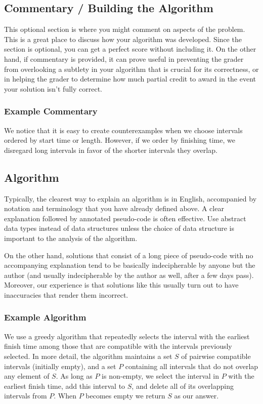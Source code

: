 \documentclass[12pt]{article}
\begin{document}
\subsection{Commentary / Building the Algorithm}
This optional section is where you might comment on aspects of the problem. This is a great place to discuss how your algorithm was developed. Since the section is optional, you can get a perfect score without including it. On the other hand, if commentary is provided, it can prove useful in preventing the grader from overlooking a subtlety in your algorithm that is crucial for its correctness, or in helping the grader to determine how much partial credit to award in the event your solution isn't fully correct.

\subsubsection{Example Commentary}
We notice that it is easy to create counterexamples when we choose intervals ordered by start time or length. However, if we order by finishing time, we disregard long intervals in favor of the shorter intervals they overlap.

\subsection{Algorithm}
Typically, the clearest way to explain an algorithm is in English, accompanied by notation and terminology that you have already defined above. A clear explanation followed by annotated pseudo-code is often effective. Use abstract data types instead of data structures unless the choice of data structure is important to the analysis of the  algorithm.

On the other hand, solutions that consist of a long piece of pseudo-code with
no accompanying explanation tend to be basically indecipherable by anyone but the author (and usually indecipherable by the author as well, after a few days pass). Moreover, our experience is that solutions like this usually turn out to have inaccuracies that render them incorrect.

\subsubsection{Example Algorithm} 

We use a greedy algorithm that repeatedly selects the interval with the earliest finish time among those that are compatible with the intervals previously selected. In more detail, the algorithm maintains a set $S$ of pairwise compatible intervals (initially empty), and a set $P$ containing all intervals that do not overlap any element of $S$. As long as $P$ is non-empty, we select the interval in $P$ with the earliest finish time, add this interval to $S$, and delete all of its overlapping intervals from $P$. When $P$ becomes empty we return $S$ as our answer.
\end{document}
